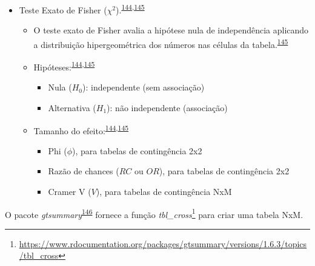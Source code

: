 \documentclass[
  a4paper,
]{book}
\renewcommand{\href}[2]{#2\footnote{\url{#1}}}
\newenvironment{infobox}[1]
  {
  \begin{itemize}
  \renewcommand{\labelitemi}{
    \raisebox{-.7\height}[0pt][0pt]{
      {\setkeys{Gin}{width=3em,keepaspectratio}
        \texttt{[image: \#1]}}
    }
  }
  \setlength{\fboxsep}{1em}
  \begin{blackbox}
  \item
  }
  {
  \end{blackbox}
  \end{itemize}
  }
\begin{document}
\begin{itemize}
\item
  Teste Exato de Fisher (\(\chi^2\)).\textsuperscript{\protect\hyperlink{ref-McHugh2013}{144},\protect\hyperlink{ref-Kim2017a}{145}}

  \begin{itemize}
  \item
    O teste exato de Fisher avalia a hipótese nula de independência aplicando a distribuição hipergeométrica dos números nas células da tabela.\textsuperscript{\protect\hyperlink{ref-Kim2017a}{145}}
  \item
    Hipóteses:\textsuperscript{\protect\hyperlink{ref-McHugh2013}{144},\protect\hyperlink{ref-Kim2017a}{145}}

    \begin{itemize}
    \item
      Nula (\(H_{0}\)): independente (sem associação)
    \item
      Alternativa (\(H_{1}\)): não independente (associação)
    \end{itemize}
  \item
    Tamanho do efeito:\textsuperscript{\protect\hyperlink{ref-McHugh2013}{144},\protect\hyperlink{ref-Kim2017a}{145}}

    \begin{itemize}
    \item
      Phi (\(\phi\)), para tabelas de contingência 2x2
    \item
      Razão de chances (\(RC\) ou \(OR\)), para tabelas de contingência 2x2
    \item
      Cramer V (\(V\)), para tabelas de contingência NxM
    \end{itemize}
  \end{itemize}
\end{itemize}

\begin{infobox}{images/Rlogo}
O pacote \emph{gtsummary}\textsuperscript{\protect\hyperlink{ref-gtsummary}{146}} fornece a função \href{https://www.rdocumentation.org/packages/gtsummary/versions/1.6.3/topics/tbl_cross}{\emph{tbl\_cross}} para criar uma tabela NxM.

\end{infobox}
\end{document}

